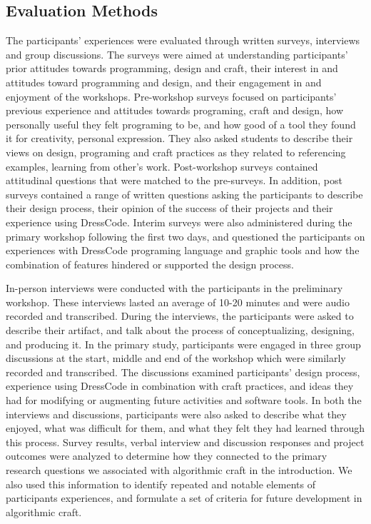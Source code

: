 \documentclass{sigchi}
\begin{document}
\subsection{Evaluation Methods}
The participants' experiences were evaluated through written surveys, interviews and group discussions. The surveys were aimed at understanding participants' prior attitudes towards programming, design and craft, their interest in and attitudes toward programming and design, and their engagement in and enjoyment of the workshops. Pre-workshop surveys focused on participants' previous experience and attitudes towards programing, craft and design, how personally useful they felt programing to be, and how good of a tool they found it for creativity, personal expression. They also asked students to describe their views on design, programing and craft practices as they related to referencing examples, learning from other's work. Post-workshop surveys contained attitudinal questions that were matched to the pre-surveys. In addition, post surveys contained a range of written questions asking the participants to describe their design process, their opinion of the success of their projects and their experience using DressCode. Interim surveys were also administered during the primary workshop following the first two days, and questioned the participants on experiences with DressCode programing language and graphic tools and how the combination of features hindered or supported the design process.

In-person interviews were conducted with the participants in the preliminary workshop. These interviews lasted an average of 10-20 minutes and were audio recorded and transcribed. During the interviews, the participants were asked to describe their artifact, and talk about the process of conceptualizing, designing, and producing it. In the primary study, participants were engaged in three group discussions at the start, middle and end of the workshop which were similarly recorded and transcribed. The discussions examined participants' design process, experience using DressCode in combination with craft practices, and ideas they had for modifying or augmenting future activities and software tools. In both the interviews and discussions, participants were also asked to describe what they enjoyed, what was difficult for them, and what they felt they had learned through this process. Survey results, verbal interview and discussion responses and project outcomes were analyzed to determine how they connected to the primary research questions we associated with algorithmic craft in the introduction. We also used this information to identify repeated and notable elements of participants experiences, and formulate a set of criteria for future development in algorithmic craft.
\end{document}

